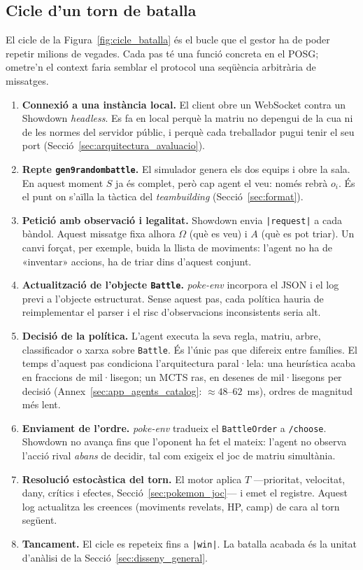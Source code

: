 \subsection{Cicle d'un torn de batalla}

El cicle de la Figura~\ref{fig:cicle_batalla} és el bucle que el gestor ha de poder repetir milions de vegades. Cada pas té una funció concreta en el POSG; ometre'n el context faria semblar el protocol una seqüència arbitrària de missatges.

\begin{enumerate}
    \item \textbf{Connexió a una instància local.} El client obre un WebSocket contra un Showdown \emph{headless}. Es fa en local perquè la matriu no depengui de la cua ni de les normes del servidor públic, i perquè cada treballador pugui tenir el seu port (Secció~\ref{sec:arquitectura_avaluacio}).
    \item \textbf{Repte \texttt{gen9randombattle}.} El simulador genera els dos equips i obre la sala. En aquest moment $S$ ja és complet, però cap agent el veu: només rebrà $o_i$. És el punt on s'aïlla la tàctica del \emph{teambuilding} (Secció~\ref{sec:format}).
    \item \textbf{Petició amb observació i legalitat.} Showdown envia \texttt{|request|} a cada bàndol. Aquest missatge fixa alhora $\Omega$ (què es veu) i $A$ (què es pot triar). Un canvi forçat, per exemple, buida la llista de moviments: l'agent no ha de «inventar» accions, ha de triar dins d'aquest conjunt.
    \item \textbf{Actualització de l'objecte \texttt{Battle}.} \textit{poke-env} incorpora el JSON i el log previ a l'objecte estructurat. Sense aquest pas, cada política hauria de reimplementar el parser i el risc d'observacions inconsistents seria alt.
    \item \textbf{Decisió de la política.} L'agent executa la seva regla, matriu, arbre, classificador o xarxa sobre \texttt{Battle}. És l'únic pas que difereix entre famílies. El temps d'aquest pas condiciona l'arquitectura paral·lela: una heurística acaba en fraccions de mil·lisegon; un MCTS ras, en desenes de mil·lisegons per decisió (Annex~\ref{sec:app_agents_catalog}: $\approx 48$--$62$~ms), ordres de magnitud més lent.
    \item \textbf{Enviament de l'ordre.} \textit{poke-env} tradueix el \texttt{BattleOrder} a \texttt{/choose}. Showdown no avança fins que l'oponent ha fet el mateix: l'agent no observa l'acció rival \emph{abans} de decidir, tal com exigeix el joc de matriu simultània.
    \item \textbf{Resolució estocàstica del torn.} El motor aplica $T$ ---prioritat, velocitat, dany, crítics i efectes, Secció~\ref{sec:pokemon_joc}--- i emet el registre. Aquest log actualitza les creences (moviments revelats, HP, camp) de cara al torn següent.
    \item \textbf{Tancament.} El cicle es repeteix fins a \texttt{|win|}. La batalla acabada és la unitat d'anàlisi de la Secció~\ref{sec:disseny_general}.
\end{enumerate}

